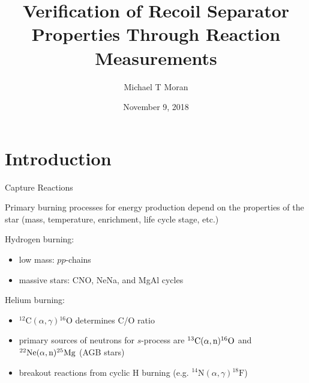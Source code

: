 \documentclass[10pt]{beamer}
\title{
    Verification of Recoil Separator Properties Through Reaction Measurements
}
\subtitle{}
\date{November 9, 2018}
\author{Michael T Moran}
\institute{University of Notre Dame}
\newcommand{\mnuc}[2]{{}^{#1}\textrm{#2}}
\newcommand{\react}[4]{$#1(#2,#3)#4$}
\begin{document}
\maketitle


\section{Introduction}

\begin{frame}[fragile]{Capture Reactions}

    Primary burning processes for energy production depend on the
    properties of the star (mass, temperature, enrichment, life cycle
    stage, etc.)

    Hydrogen burning:
    \begin{itemize}
        \item low mass: $pp$-chains
        \item massive stars: CNO, NeNa, and MgAl cycles
    \end{itemize}

    Helium burning:
    \begin{itemize}
        \item \react{\mnuc{12}{C}}{\alpha}{\gamma}{\mnuc{16}{O}}
            determines C/O ratio
        \item primary sources of neutrons for $s$-process are
            \react{\mnuc{13}{C}}{\alpha}{\rm n}{\mnuc{16}{O}} and
            \react{\mnuc{22}{Ne}}{\alpha}{\rm n}{\mnuc{25}{Mg}} (AGB
            stars)
        \item breakout reactions from cyclic H burning (e.g.
            \react{\mnuc{14}{N}}{\alpha}{\gamma}{\mnuc{18}{F}})
    \end{itemize}

\end{frame}



\end{document}
